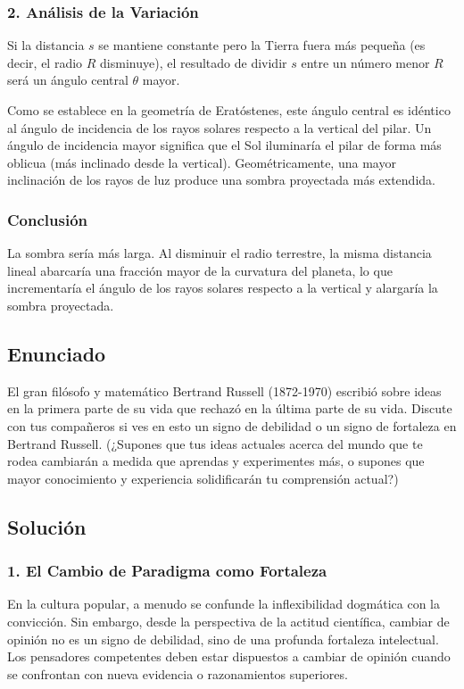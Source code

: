 \documentclass[12pt, a4paper]{article}
\begin{document}
\subsubsection*{2. Análisis de la Variación}
Si la distancia $s$ se mantiene constante pero la Tierra fuera más pequeña (es decir, el radio $R$ disminuye), el resultado de dividir $s$ entre un número menor $R$ será un ángulo central $\theta$ mayor. 

Como se establece en la geometría de Eratóstenes, este ángulo central es idéntico al ángulo de incidencia de los rayos solares respecto a la vertical del pilar. Un ángulo de incidencia mayor significa que el Sol iluminaría el pilar de forma más oblicua (más inclinado desde la vertical). Geométricamente, una mayor inclinación de los rayos de luz produce una sombra proyectada más extendida.

\subsubsection*{Conclusión}
La sombra sería más larga. Al disminuir el radio terrestre, la misma distancia lineal abarcaría una fracción mayor de la curvatura del planeta, lo que incrementaría el ángulo de los rayos solares respecto a la vertical y alargaría la sombra proyectada.

\newpage

\subsection*{Enunciado}
El gran filósofo y matemático Bertrand Russell (1872-1970) escribió sobre ideas en la primera parte de su vida que rechazó en la última parte de su vida. Discute con tus compañeros si ves en esto un signo de debilidad o un signo de fortaleza en Bertrand Russell. (¿Supones que tus ideas actuales acerca del mundo que te rodea cambiarán a medida que aprendas y experimentes más, o supones que mayor conocimiento y experiencia solidificarán tu comprensión actual?)

\subsection*{Solución}

\subsubsection*{1. El Cambio de Paradigma como Fortaleza}
En la cultura popular, a menudo se confunde la inflexibilidad dogmática con la convicción. Sin embargo, desde la perspectiva de la actitud científica, cambiar de opinión no es un signo de debilidad, sino de una profunda fortaleza intelectual. Los pensadores competentes deben estar dispuestos a cambiar de opinión cuando se confrontan con nueva evidencia o razonamientos superiores.
\end{document}
